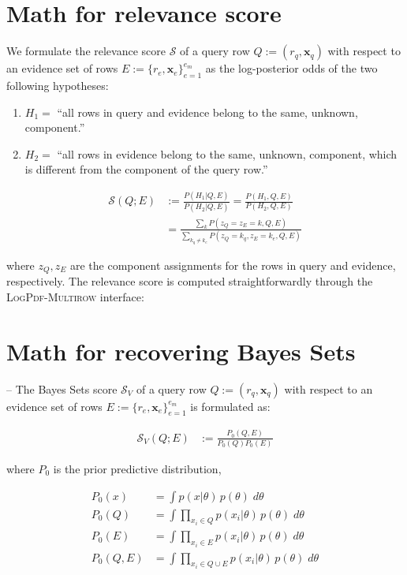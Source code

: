 \documentclass{article}
\newcommand{\iV}{\mathit{V}}
\newcommand{\set}[1]{\{{#1}\}}
\begin{document}
\section{Math for relevance score}

We formulate the relevance score $\mathcal{S}$ of a query row
$Q:=(r_q, \bm{x}_q)$ with respect to an evidence set of rows
$E:=\set{r_{e}, \bm{x}_e}_{e=1}^{e_m}$ as the log-posterior odds of
the two following hypotheses:

\begin{enumerate}
\item $H_1 = $ ``all rows in query and evidence belong to the same, unknown, component.''
\item $H_2 = $ ``all rows in evidence belong to the same, unknown, component, which is different from the component of the query row.''
\end{enumerate}

\begin{align*}
  \mathcal{S}(Q;E) &:= \frac{P(H_1|Q,E)}{P(H_2|Q,E)} = \frac{P(H_1,Q,E)}{P(H_2,Q,E)} \\
      &= \frac{\sum_k P(z_Q=z_E=k,Q,E)}{\sum_{k_q \neq k_e} P(z_Q=k_q, z_E=k_e,Q,E)}
\end{align*}

where $z_Q, z_E$ are the component assignments for the rows in query and evidence, respectively. The relevance score is computed straightforwardly through the \textsc{LogPdf-Multirow} interface: 



\section{Math for recovering Bayes Sets}
--
The Bayes Sets score $\mathcal{S}_\iV$ of a query row
$Q:=(r_q, \bm{x}_q)$ with respect to an evidence set of rows
$E:=\set{r_{e}, \bm{x}_e}_{e=1}^{e_m}$ is formulated as:


\begin{align*}
  \mathcal{S}_\iV(Q;E) &:= \frac{P_0(Q,E)}{P_0(Q)P_0(E)}
\end{align*}

where $P_0$ is the prior predictive distribution,

\begin{align*}
  P_0(x) &= \int p(x|\theta) \, p(\theta) \; d\theta \\
  P_0(Q) &= \int \prod_{x_i \in Q} p(x_i|\theta)\, p(\theta)\; d\theta \\
  P_0(E) &= \int \prod_{x_i \in E} p(x_i|\theta)\, p(\theta)\; d\theta \\
  P_0(Q, E) &= \int \prod_{x_i \in Q \cup E} p(x_i|\theta)\, p(\theta)\; d\theta 
\end{align*}
\end{document}
